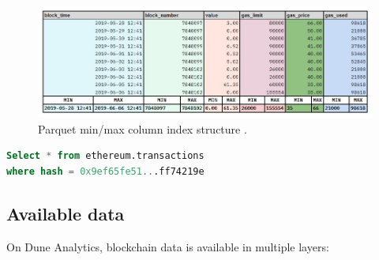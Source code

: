 \begin{figure}[H]
  \centering
  \includegraphics[width=1\textwidth]{Figures/parquet-index.jpg}
  \caption[Parquet ColumnIndex on Dune Analytics]{Parquet min/max column index structure \protect\footnotemark. }
  \label{fig:parquet-index}
\end{figure}


\begin{lstlisting}[language=SQL,caption={Shortened simple query on DuneSQL that took 3 minutes to run},label={lst:dune-query},captionpos=b]
Select * from ethereum.transactions
where hash = 0x9ef65fe51...ff74219e
\end{lstlisting}

\subsection{Available data}

On Dune Analytics, blockchain data is available in multiple layers:

